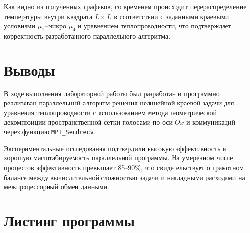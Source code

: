 	Как видно из полученных графиков, со временем происходит перераспределение температуры внутри квадрата $L \times L$ в соответствии с заданными краевыми условиями $\mu_1$--микро $\mu_4$ и уравнением теплопроводности, что подтверждает корректность разработанного параллельного алгоритма.
	
	\section{Выводы}
	В ходе выполнения лабораторной работы был разработан и программно реализован параллельный алгоритм решения нелинейной краевой задачи для уравнения теплопроводности с использованием метода геометрической декомпозиции пространственной сетки полосами по оси $Ox$ и коммуникаций через функцию \texttt{MPI\_Sendrecv}. 
	
	Экспериментальные исследования подтвердили высокую эффективность и хорошую масштабируемость параллельной программы. На умеренном числе процессов эффективность превышает 85–90\%, что свидетельствует о грамотном балансе между вычислительной сложностью задачи и накладными расходами на межпроцессорный обмен данными.
	
	\newpage
	
	\section{Листинг программы}
	
